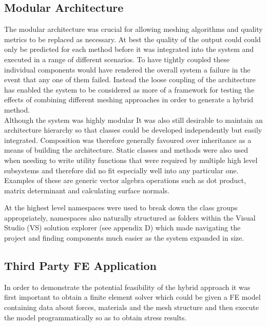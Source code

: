 \subsection{Modular Architecture}
The modular architecture was crucial for allowing meshing algorithms and quality metrics to be replaced as necessary. At best the quality of the output could could only be predicted for each method before it was integrated into the system and executed in a range of different scenarios. To have tightly coupled these individual components would have rendered the overall system a failure in the event that any one of them failed. Instead the loose coupling of the architecture has enabled the system to be considered as more of a framework for testing the effects of combining different meshing approaches in order to generate a hybrid method.\\

\noindent
Although the system was highly modular It was also still desirable to maintain an architecture hierarchy so that classes could be developed independently but easily integrated. Composition was therefore generally favoured over inheritance as a means of building the architecture. Static classes and methods were also used when needing to write utility functions that were required by multiple high level subsystems and therefore did no fit especially well into any particular one. Examples of these are generic vector algebra operations such as dot product, matrix determinant and calculating surface normals.

\noindent
At the highest level namespaces were used to break down the class groups appropriately, namespaces also naturally structured as folders within the Visual Studio (VS) solution explorer (see appendix D) which made navigating the project and finding components much easier as the system expanded in size.

\subsection{Third Party FE Application}
In order to demonstrate the potential feasibility of the hybrid approach it was first important to obtain a finite element solver which could be given a FE model containing data about forces, materials and the mesh structure and then execute the model programmatically so as to obtain stress results. \\ 

